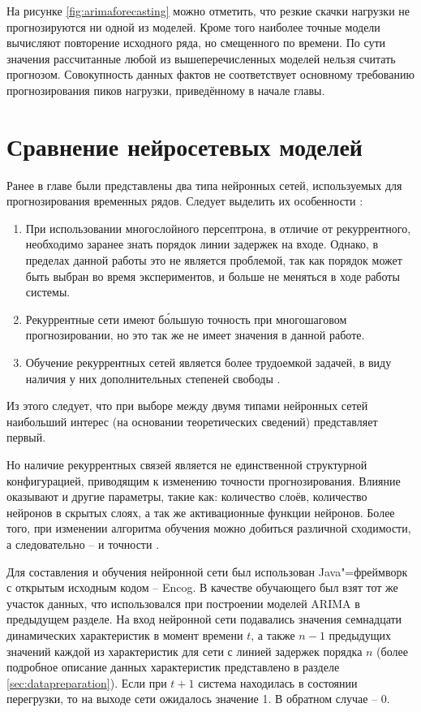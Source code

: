 \documentclass[a4paper,14pt,russian]{extreport}
\begin{document}
\newpage
На рисунке \ref{fig:arimaforecasting} можно отметить, что резкие скачки нагрузки 
не прогнозируются ни одной из моделей. Кроме того наиболее точные модели 
вычисляют повторение исходного ряда, но смещенного по времени. По сути 
значения рассчитанные любой из вышеперечисленных моделей нельзя считать 
прогнозом. Совокупность данных фактов не соответствует основному 
требованию прогнозирования пиков нагрузки, приведённому в начале главы.

\section{Сравнение нейросетевых моделей} 
Ранее в главе были представлены два типа нейронных сетей, используемых для 
прогнозирования временных рядов. Следует выделить их особенности 
\cite{chernodub2012}:
\begin{enumerate}
	\item При использовании многослойного персептрона, в отличие от 
		рекуррентного, необходимо заранее знать порядок линии задержек на 
		входе. Однако, в пределах данной работы это не является проблемой, 
		так как порядок может быть выбран во время экспериментов, и 
		больше не меняться в ходе работы системы.
	\item Рекуррентные сети имеют б\'{о}льшую точность при многошаговом 
		прогнозировании, но это так же не имеет значения в данной работе.
	\item Обучение рекуррентных сетей является более трудоемкой задачей, в 
		виду наличия у них дополнительных степеней свободы 
		\cite{medsker2000, naseera2015}.
\end{enumerate}
Из этого следует, что при выборе между двумя типами нейронных сетей 
наибольший интерес (на основании теоретических сведений) представляет 
первый. 

Но наличие рекуррентных связей является не единственной структурной 
конфигурацией, приводящим к изменению точности прогнозирования. Влияние 
оказывают и другие параметры, такие как: количество слоёв, количество  
нейронов в скрытых слоях, а так же активационные функции нейронов. Более  
того, при изменении алгоритма обучения можно добиться различной 
сходимости, а следовательно -- и точности \cite{naseera2015}.

Для составления и обучения нейронной сети был использован Java"=фреймворк 
с открытым исходным кодом -- Encog. В качестве обучающего был взят тот же 
участок данных, что использовался при построении моделей ARIMA в 
предыдущем разделе. На вход нейронной сети подавались значения семнадцати 
динамических характеристик в момент времени $t$, а также $n - 1$ предыдущих 
значений каждой из характеристик для сети с линией задержек порядка $n$ 
(более подробное описание данных характеристик представлено в разделе 
\ref{sec:datapreparation}). Если при $t + 1$ система находилась в состоянии 
перегрузки, то на выходе сети ожидалось значение 1. В обратном случае -- 0.
\end{document}
